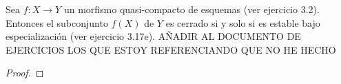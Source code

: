 \documentclass[GA.tex]{subfiles}
\begin{document}
\begin{lemma}
Sea $f:X\to Y$ un morfismo quasi-compacto de esquemas (ver ejercicio 3.2). Entonces el subconjunto $f(X)$ de $Y$ es cerrado si y solo si es estable bajo especialización (ver ejercicio 3.17e). AÑADIR AL DOCUMENTO DE EJERCICIOS LOS QUE ESTOY REFERENCIANDO QUE NO HE HECHO
\end{lemma}
\begin{proof}

\end{proof}
\end{document}
